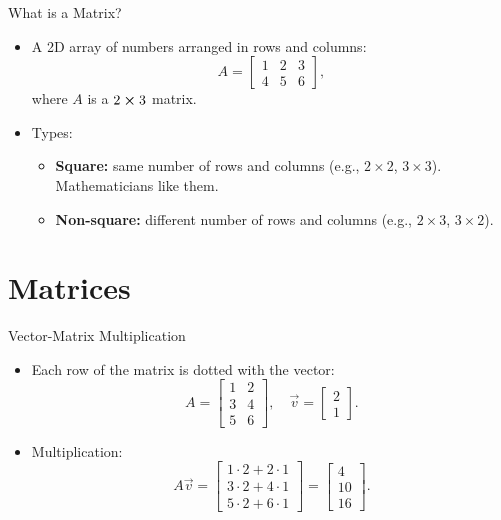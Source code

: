 \documentclass{beamer}
\begin{document}
\begin{frame}{What is a Matrix?}
  \begin{itemize}
    \item A 2D array of numbers arranged in rows and columns:
    \begin{equation}
    A = \begin{bmatrix} 1 & 2 & 3 \\ 4 & 5 & 6 \end{bmatrix},
    \end{equation}
    where \(A\) is a \(2\cross3\) matrix.
    \item Types:
    \begin{itemize}
      \item \textbf{Square:} same number of rows and columns (e.g., $2\times2$, $3\times3$). Mathematicians like them.
      \item \textbf{Non-square:} different number of rows and columns (e.g., $2\times3$, $3\times2$).
    \end{itemize}
  \end{itemize}
\end{frame}

\section{Matrices}
\begin{frame}{Vector-Matrix Multiplication}
  \begin{itemize}
    \item Each row of the matrix is dotted with the vector:
    \begin{equation}
    A = \begin{bmatrix} 1 & 2 \\ 3 & 4 \\ 5 & 6 \end{bmatrix}, \quad \vec{v} = \begin{bmatrix} 2 \\ 1 \end{bmatrix}.
    \end{equation}
    \item Multiplication:
    \begin{equation}
    A\vec{v} = \begin{bmatrix}
    1\cdot2 + 2\cdot1 \\
    3\cdot2 + 4\cdot1 \\
    5\cdot2 + 6\cdot1
    \end{bmatrix} = \begin{bmatrix} 4 \\ 10 \\ 16 \end{bmatrix}.
    \end{equation}
  \end{itemize}
\end{frame}
\end{document}

